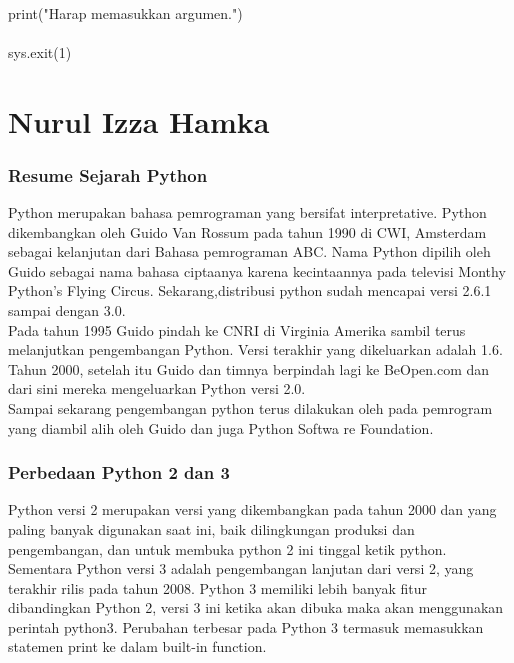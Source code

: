 \paragraph{}
    print("Harap memasukkan argumen.")
    \paragraph{}
    sys.exit(1)

\section{Nurul Izza Hamka} 
\subsubsection{Resume Sejarah Python}

Python merupakan bahasa pemrograman yang bersifat interpretative. Python dikembangkan oleh Guido Van Rossum pada tahun 1990 di CWI, Amsterdam sebagai kelanjutan dari Bahasa pemrograman ABC. Nama Python dipilih oleh Guido sebagai nama bahasa ciptaanya karena kecintaannya pada televisi Monthy Python’s Flying Circus. Sekarang,distribusi python sudah mencapai versi 2.6.1 sampai dengan 3.0.\\

Pada tahun 1995 Guido pindah ke CNRI di Virginia Amerika sambil terus melanjutkan pengembangan Python. Versi terakhir yang dikeluarkan adalah 1.6. Tahun 2000, setelah itu Guido dan timnya berpindah lagi ke BeOpen.com dan dari sini mereka mengeluarkan Python versi 2.0.\\

Sampai sekarang pengembangan python terus dilakukan oleh pada pemrogram yang diambil alih oleh  Guido dan juga Python Softwa
re Foundation. 

\subsubsection{Perbedaan Python 2 dan 3}

Python versi 2 merupakan versi yang dikembangkan pada tahun 2000 dan yang paling banyak digunakan saat ini, baik dilingkungan produksi dan pengembangan, dan untuk membuka python 2 ini tinggal ketik python.\\
 
Sementara Python versi 3 adalah pengembangan lanjutan dari versi 2, yang terakhir rilis pada tahun 2008. Python 3 memiliki lebih banyak fitur dibandingkan Python 2, versi 3 ini ketika akan dibuka maka akan menggunakan perintah python3. Perubahan terbesar pada Python 3 termasuk memasukkan statemen print ke dalam built-in function.\\

